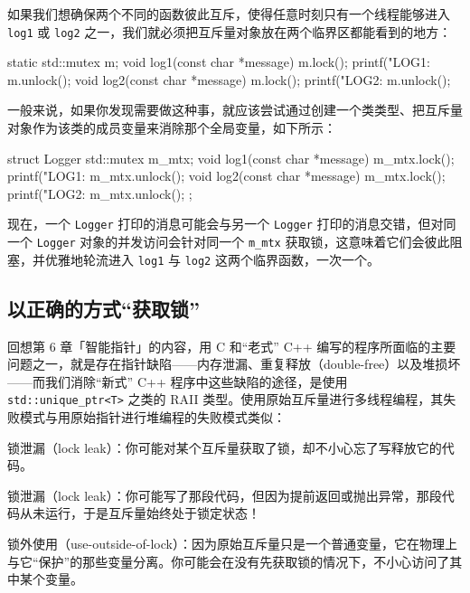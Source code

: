 如果我们想确保两个不同的函数彼此互斥，使得任意时刻只有一个线程能够进入 \texttt{log1} 或 \texttt{log2} 之一，我们就必须把互斥量对象放在两个临界区都能看到的地方：

\begin{codebox}[cpp]
    static std::mutex m;
    void log1(const char *message) {
      m.lock();
      printf("LOG1: %
      m.unlock();
    }
    void log2(const char *message) {
      m.lock();
      printf("LOG2: %
      m.unlock();
    }
\end{codebox}

一般来说，如果你发现需要做这种事，就应该尝试通过创建一个类类型、把互斥量对象作为该类的成员变量来消除那个全局变量，如下所示：

\begin{codebox}[cpp]
    struct Logger {
      std::mutex m_mtx;
      void log1(const char *message) {
        m_mtx.lock();
        printf("LOG1: %
        m_mtx.unlock();
      }
      void log2(const char *message) {
        m_mtx.lock();
        printf("LOG2: %
        m_mtx.unlock();
      }
    };
\end{codebox}

现在，一个 \texttt{Logger} 打印的消息可能会与另一个 \texttt{Logger} 打印的消息交错，但对同一个 \texttt{Logger} 对象的并发访问会针对同一个 \texttt{m\_\allowbreak{}mtx} 获取锁，这意味着它们会彼此阻塞，并优雅地轮流进入 \texttt{log1} 与 \texttt{log2} 这两个临界函数，一次一个。

\subsection{以正确的方式“获取锁”}

回想第 6 章「智能指针」的内容，用 C 和“老式” C++ 编写的程序所面临的主要问题之一，就是存在指针缺陷——内存泄漏、重复释放（double-free）以及堆损坏——而我们消除“新式” C++ 程序中这些缺陷的途径，是使用 \texttt{std::\allowbreak{}unique\_\allowbreak{}ptr<\allowbreak{}T>\allowbreak{}} 之类的 RAII 类型。使用原始互斥量进行多线程编程，其失败模式与用原始指针进行堆编程的失败模式类似：

锁泄漏（lock leak）：你可能对某个互斥量获取了锁，却不小心忘了写释放它的代码。

锁泄漏（lock leak）：你可能写了那段代码，但因为提前返回或抛出异常，那段代码从未运行，于是互斥量始终处于锁定状态！

锁外使用（use-outside-of-lock）：因为原始互斥量只是一个普通变量，它在物理上与它“保护”的那些变量分离。你可能会在没有先获取锁的情况下，不小心访问了其中某个变量。

